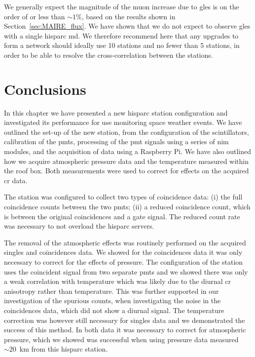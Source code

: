 We generally expect the magnitude of the muon increase due to \glspl{gle} is on the order of or less than $\sim 1 \%$, based on the results shown in Section~\ref{sec:MAIRE_flux}. We have shown that we do not expect to observe \glspl{gle} with a single \gls{hisparc} \gls{md}.  We therefore recommend here that any upgrades to form a network should ideally use 10 stations and no fewer than 5 stations, in order to be able to resolve the cross-correlation between the stations. %


\section{Conclusions}\label{sec:HS_14008_conclusion}

In this chapter we have presented a new \gls{hisparc} station configuration and investigated its performance for use monitoring space weather events. We have outlined the set-up of the new station, from the configuration of the scintillators, calibration of the \glspl{pmt}, processing of the \gls{pmt} signals using a series of \gls{nim} modules, and the acquisition of data using a Raspberry Pi. We have also outlined how we acquire atmospheric pressure data and the temperature measured within the roof box. Both measurements were used to correct for effects on the acquired \gls{cr} data.

The station was configured to collect two types of coincidence data: (i) the full coincidence counts between the two \glspl{pmt}; (ii) a reduced coincidence count, which is between the original coincidences and a gate signal. The reduced count rate was necessary to not overload the \gls{hisparc} servers.

The removal of the atmospheric effects was routinely performed on the acquired singles and coincidences data. We showed for the coincidences data it was only necessary to correct for the effects of pressure. The configuration of the station uses the coincident signal from two separate \glspl{pmt} and we showed there was only a weak correlation with temperature which was likely due to the diurnal \gls{cr} anisotropy rather than temperature. This was further supported in our investigation of the spurious counts, when investigating the noise in the coincidences data, which did not show a diurnal signal. The temperature correction was however still necessary for singles data and we demonstrated the success of this method. In both data it was necessary to correct for atmospheric pressure, which we showed was successful when using pressure data measured  $\sim 20$~km from this \gls{hisparc} station.

